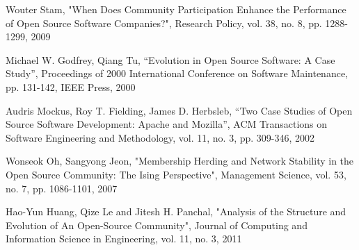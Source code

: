 \documentclass[conference]{IEEEtran}
\begin{document}
\begin{thebibliography}{1}
Wouter Stam, "When Does Community Participation Enhance the Performance of Open Source Software Companies?", Research Policy, vol. 38, no. 8, pp. 1288-1299, 2009 

Michael W. Godfrey, Qiang Tu, “Evolution in Open Source Software: A Case Study”, Proceedings of 2000 International Conference on Software Maintenance, pp. 131-142, IEEE Press, 2000

Audris Mockus, Roy T. Fielding, James D. Herbsleb, “Two Case Studies of Open Source Software Development: Apache and Mozilla”, ACM Transactions on Software Engineering and Methodology, vol. 11, no. 3, pp. 309-346, 2002

Wonseok Oh, Sangyong Jeon, "Membership Herding and Network Stability in the Open Source Community: The Ising Perspective", Management Science, vol. 53, no. 7, pp. 1086-1101, 2007

Hao-Yun Huang, Qize Le and Jitesh H. Panchal, "Analysis of the Structure and Evolution of An Open-Source Community", Journal of Computing and Information Science in Engineering, vol. 11, no. 3, 2011

\end{thebibliography}
\end{document}
